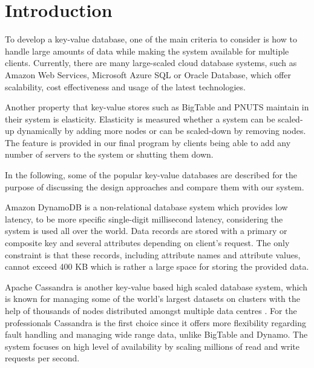 \section{Introduction}
\label{sec:introduction}

To develop a key-value database, one of the main criteria to consider is how to handle large amounts of data while making the system available for multiple clients. Currently, there are many large-scaled cloud database systems, such as Amazon Web Services, Microsoft Azure SQL or Oracle Database, which offer scalability, cost effectiveness and usage of the latest technologies. 

Another property that key-value stores such as BigTable and PNUTS maintain in their system is elasticity. Elasticity is measured whether a system can be scaled-up dynamically by adding more nodes or can be scaled-down by removing nodes\cite{agrawal2011database}. The feature is provided in our final program by clients being able to add any number of servers to the system or shutting them down.

In the following, some of the popular key-value databases are described for the purpose of discussing the design approaches and compare them with our system.

Amazon DynamoDB is a non-relational database system which provides low latency, to be more specific single-digit millisecond latency\cite{amazon}, considering the system is used all over the world. Data records are stored with a primary or composite key and several attributes depending on client's request\cite{kalid2017big}. The only constraint is that these records, including attribute names and attribute values, cannot exceed 400 KB\cite{amazon} which is rather a large space for storing the provided data.

Apache Cassandra is another key-value based high scaled\cite{abadi2012consistency} database system, which is known for managing some of the world's largest datasets on clusters with the help of thousands of nodes distributed amongst multiple data centres \cite{chebotko2015big}. For the professionals Cassandra is the first choice since it offers more flexibility regarding fault handling and managing wide range data, unlike BigTable and Dynamo\cite{kalid2017big}. The system focuses on high level of availability by scaling millions of read and write requests per second\cite{chebotko2015big}.

